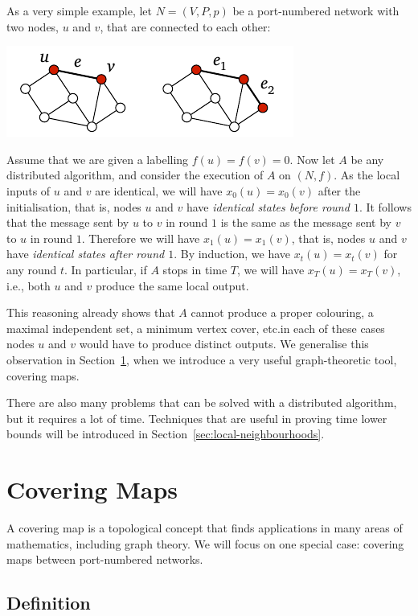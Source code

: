 As a very simple example, let $N = (V,P,p)$ be a port-numbered network with two nodes, $u$ and $v$, that are connected to each other:
\begin{center}
    \includegraphics[page=\PPnnTwoNode]{figs.pdf}
\end{center}
Assume that we are given a labelling $f(u) = f(v) = 0$. Now let $A$ be any distributed algorithm, and consider the execution of $A$ on $(N,f)$. As the local inputs of $u$ and $v$ are identical, we will have $x_0(u) = x_0(v)$ after the initialisation, that is, nodes $u$ and $v$ have \emph{identical states before round $1$}. It follows that the message sent by $u$ to $v$ in round $1$ is the same as the message sent by $v$ to $u$ in round $1$. Therefore we will have $x_1(u) = x_1(v)$, that is, nodes $u$ and $v$ have \emph{identical states after round $1$}. By induction, we have $x_t(u) = x_t(v)$ for any round $t$. In particular, if $A$ stops in time $T$, we will have $x_T(u) = x_T(v)$, i.e., both $u$ and $v$ produce the same local output.

This reasoning already shows that $A$ cannot produce a proper colouring, a maximal independent set, a minimum vertex cover, etc.\mydash in each of these cases nodes $u$ and $v$ would have to produce distinct outputs. We generalise this observation in Section~\ref{sec:covering-map}, when we introduce a very useful graph-theoretic tool, covering maps.

There are also many problems that can be solved with a distributed algorithm, but it requires a lot of time. Techniques that are useful in proving time lower bounds will be introduced in Section~\ref{sec:local-neighbourhoods}.

\section{Covering Maps}\label{sec:covering-map}

A covering map is a topological concept that finds applications in many areas of mathematics, including graph theory. We will focus on one special case: covering maps between port-numbered networks.

\subsection{Definition}

